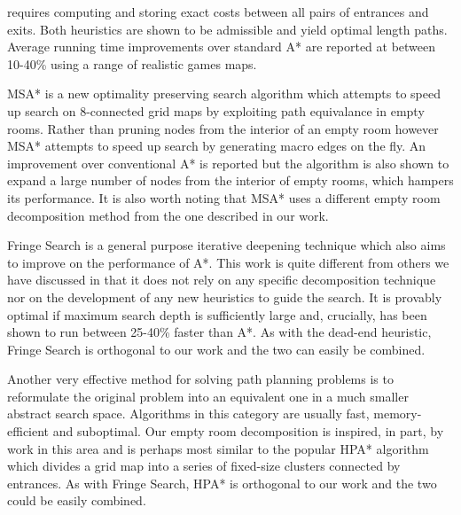 requires computing and storing exact costs between all pairs of entrances and exits.
Both heuristics are shown to be admissible and yield optimal length paths. 
Average running time improvements over standard A* are reported at between 10-40\% using a range of
realistic games maps.
\par
MSA* \cite{bolanca09} is a new optimality preserving search algorithm which attempts to speed up search 
on 8-connected grid maps by exploiting path equivalance in empty rooms. 
Rather than pruning nodes from the interior of an empty room however MSA* attempts to speed up 
search by generating macro edges on the fly.
An improvement over conventional A* is reported but the algorithm is also
shown to expand a large number of nodes from the interior of empty rooms, which hampers its performance.
It is also worth noting that MSA* uses a different empty room decomposition method
from the one described in our work.
\par
Fringe Search \cite{bjornsson05} is a general purpose iterative deepening technique which also
aims to improve on the performance of A*.
This work is quite different from others we have discussed in that it does not
rely on any specific decomposition technique nor on the development of any new heuristics
to guide the search.
It is provably optimal if maximum search depth is sufficiently large and, crucially, has been shown to 
run between 25-40\% faster than A*.
As with the dead-end heuristic, Fringe Search is orthogonal to our work and the two
can easily be combined.
\par
Another very effective method for solving path planning problems is to reformulate the original problem
into an equivalent one in a much smaller abstract search space. 
Algorithms in this category are usually fast, memory-efficient and suboptimal.
Our empty room decomposition is inspired, in part, by work in this area and is perhaps most similar to 
the popular HPA* algorithm \cite{botea04} 
which divides a grid map into a series of fixed-size clusters connected 
by entrances.
As with Fringe Search, HPA* is orthogonal to our work and the two could be easily combined.
